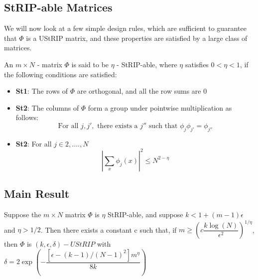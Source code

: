 \documentclass[12pt]{article}
\begin{document}
{\subsection{StRIP-able Matrices}

We will now look at a few simple design rules, which are sufficient to guarantee that $\Phi$ is a UStRIP matrix, and these properties are satisfied by a large class of matrices.

\begin{defn}
An $m \times N$ - matrix $\Phi$ is said to be $\eta$ - StRIP-able, where $\eta$ satisfies $0 < \eta < 1$, if the following conditions are satisfied:
\begin{itemize}
    \item \textbf{St1}: The rows of $\Phi$ are orthogonal, and all the row sums are 0
    \item \textbf{St2}: The columns of $\Phi$ form a group under pointwise multiplication as follows:
    \[ \text{For all } j,j', \text{ there exists a } j'' \text{ such that } \phi_j\phi_{j'} = \phi_{j''}\]
    \item  \textbf{St2}: For all $j \in {2,....,N}$ 
    \[    |\sum_x \phi_j(x)|^2 \leq N^{2 - \eta}\]
\end{itemize}
\end{defn}

\subsection{Main Result}
\begin{theorem}
Suppose the $m \times N$ matrix $\Phi$ is $\eta$ StRIP-able, and suppose $k < 1 + (m - 1)\epsilon$ and $\eta > 1/2$. Then there exists a constant c such that, if $m \geq \left(c\dfrac{k\log(N)}{\epsilon^2}\right)^{1/\eta}$, then $\Phi$ is $(k, \epsilon, \delta) - UStRIP$ with $\delta = 2\exp\left(-\dfrac{[\epsilon - (k-1)/(N - 1)^2]m^{\eta}}{8k}\right)$
\end{theorem}

}
\end{document}
